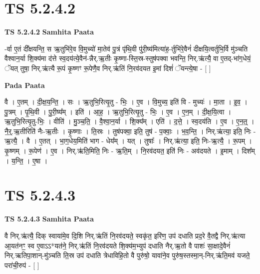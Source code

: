 \documentclass[17pt]{extarticle}
\begin{document}
\section*{ TS 5.2.4.2 }

\textbf{TS 5.2.4.2 } \newline
\textbf{Samhita Paata} \newline

-र्वा ए॒तं दी᳚क्षयन्ति॒ स ऋ॒तुभि॑रे॒व वि॒मुच्यो॑ मा॒तेव॑ पु॒त्रं पृ॑थि॒वी पु॑री॒ष्य॑मित्या॑ह॒-र्तुभि॑रे॒वैनं॑ दीक्षयि॒त्वर्तुभि॒र्वि मु॑ञ्चति वैश्वान॒र्या शि॒क्य॑मा द॑त्ते स्व॒दय॑त्ये॒वैन॑-न्नैर्.ऋ॒तीः कृ॒ष्णा-स्ति॒स्र-स्तुष॑पक्वा भवन्ति॒ निर्.ऋ॑त्यै॒ वा ए॒तद्-भा॑ग॒धेयं॒ ॅयत् तुषा॒ निर्.ऋ॑त्यै रू॒पं कृ॒ष्णꣳ रू॒पेणै॒व निर्.ऋ॑तिं नि॒रव॑दयत इ॒मां दिशं॑ ॅयन्त्ये॒षा - [  ] \newline

\textbf{Pada Paata} \newline

वै । ए॒तम् । दी॒क्ष॒य॒न्ति॒ । सः । ऋ॒तुभि॒रित्यृ॒तु - भिः॒ । ए॒व । वि॒मुच्य॒ इति॑ वि - मुच्यः॑ । मा॒ता । इ॒व॒ । पु॒त्रम् । पृ॒थि॒वी । पु॒री॒ष्य᳚म् । इति॑ । आ॒ह॒ । ऋ॒तुभि॒रित्यृ॒तु - भिः॒ । ए॒व । ए॒न॒म् । दी॒क्ष॒यि॒त्वा । ऋ॒तुभि॒रित्यृ॒तु-भिः॒ । वीति॑ । मु॒ञ्च॒ति॒ । वै॒श्वा॒न॒र्या । शि॒क्य᳚म् । एति॑ । द॒त्ते॒ । स्व॒दय॑ति । ए॒व । ए॒न॒त्॒ । नै॒र्॒.ऋ॒तीरिति॑ नैः-ऋ॒तीः । कृ॒ष्णाः । ति॒स्रः । तुष॑पक्वा॒ इति॒ तुष॑ - प॒क्वाः॒ । भ॒व॒न्ति॒ । निर्.ऋ॑त्या॒ इति॒ निः - ऋ॒त्यै॒ । वै । ए॒तत् । भा॒ग॒धेय॒मिति॑ भाग - धेय᳚म् । यत् । तुषाः᳚ । निर्.ऋ॑त्या॒ इति॒ निः-ऋ॒त्यै॒ । रू॒पम् । कृ॒ष्णम् । रू॒पेण॑ । ए॒व । निर्.ऋ॑ति॒मिति॒ निः - ऋ॒ति॒म् । नि॒रव॑दयत॒ इति॑ निः - अव॑दयते । इ॒माम् । दिश᳚म् । य॒न्ति॒ । ए॒षा ।  \newline




\section*{ TS 5.2.4.3 }

\textbf{TS 5.2.4.3 } \newline
\textbf{Samhita Paata} \newline

वै निर्.ऋ॑त्यै॒ दिक् स्वाया॑मे॒व दि॒शि निर्.ऋ॑तिं नि॒रव॑दयते॒ स्वकृ॑त॒ इरि॑ण॒ उप॑ दधाति प्रद॒रे वै॒तद्वै निर्.ऋ॑त्या आ॒यत॑नꣳ॒॒ स्व ए॒वाऽऽ*यत॑ने॒ निर्.ऋ॑तिं नि॒रव॑दयते शि॒क्य॑म॒भ्युप॑ दधाति नैर्.ऋ॒तो वै पाशः॑ सा॒क्षादे॒वैनं॑ निर्.ऋतिपा॒शान्-मु॑ञ्चति ति॒स्र उप॑ दधाति त्रेधाविहि॒तो वै पुरु॑षो॒ यावा॑ने॒व पुरु॑ष॒स्तस्मा॒न्-निर्.ऋ॑ति॒मव॑ यजते॒ परा॑ची॒रुप॑ - [  ] \newline
\end{document}
